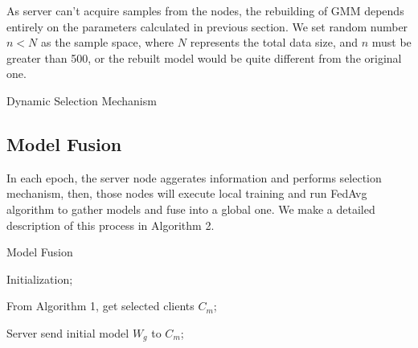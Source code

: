 \documentclass[conference]{IEEEtran}
\begin{document}
As server can't acquire samples from the nodes, 
the rebuilding of GMM depends entirely on the parameters
calculated in previous section. We set random number $n<N$ as
the sample space, where $N$ represents the total data size,
and $n$ must be greater than 500, or the rebuilt model would be quite different from the original one. 
\begin{algorithm}[t]
  \caption{Dynamic Selection Mechanism}
  \SetAlgoLined

  \label{selection}
\end{algorithm}
\subsection{Model Fusion}
In each epoch, the server node aggerates information and performs selection mechanism, then, 
those nodes will execute local training and run FedAvg algorithm to gather models and
 fuse into a global one. We make a detailed description of this process in Algorithm 2.

 \begin{algorithm}[t]
  \caption{Model Fusion}
  \SetAlgoLined
  Initialization;
  
  From Algorithm 1, get selected clients $C_m$;
  
  Server send initial model $W_g$ to $C_m$;

    \label{FedAvg}
\end{algorithm}
\end{document}
